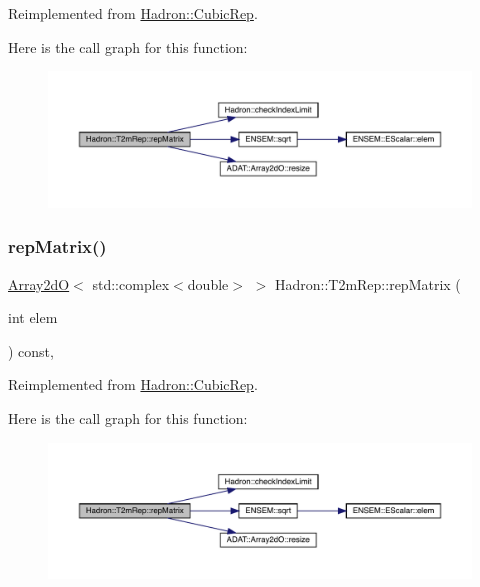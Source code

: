 Reimplemented from \mbox{\hyperlink{structHadron_1_1CubicRep_ac5d7e9e6f4ab1158b5fce3e4ad9e8005}{Hadron\+::\+Cubic\+Rep}}.

Here is the call graph for this function\+:
\nopagebreak
\begin{figure}[H]
\begin{center}
\leavevmode
\includegraphics[width=350pt]{d7/dc8/structHadron_1_1T2mRep_a19df67dde8ae1b7f7436559ee5218f13_cgraph}
\end{center}
\end{figure}
\mbox{\label{structHadron_1_1T2mRep_a19df67dde8ae1b7f7436559ee5218f13}} 
\subsubsection{\texorpdfstring{repMatrix()}{repMatrix()}\hspace{0.1cm}{\footnotesize\ttfamily [3/3]}}
{\footnotesize\ttfamily \mbox{\hyperlink{classADAT_1_1Array2dO}{Array2dO}}$<$ std\+::complex$<$double$>$ $>$ Hadron\+::\+T2m\+Rep\+::rep\+Matrix (\begin{DoxyParamCaption}\item[{int}]{elem }\end{DoxyParamCaption}) const\hspace{0.3cm}{\ttfamily [inline]}, {\ttfamily [virtual]}}



Reimplemented from \mbox{\hyperlink{structHadron_1_1CubicRep_ac5d7e9e6f4ab1158b5fce3e4ad9e8005}{Hadron\+::\+Cubic\+Rep}}.

Here is the call graph for this function\+:
\nopagebreak
\begin{figure}[H]
\begin{center}
\leavevmode
\includegraphics[width=350pt]{d7/dc8/structHadron_1_1T2mRep_a19df67dde8ae1b7f7436559ee5218f13_cgraph}
\end{center}
\end{figure}


